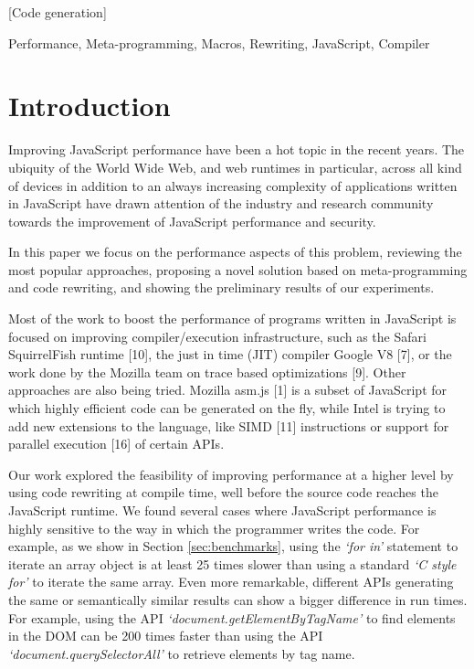 \documentclass[preprint,10pt]{sigplanconf}
\begin{document}
[Code generation]


\keywords
Performance, Meta-programming, Macros, Rewriting, JavaScript, Compiler

\section{Introduction}
Improving JavaScript performance have been a hot topic in the recent years. The ubiquity of the World Wide Web, and web runtimes in particular, across all kind of devices in addition to an always increasing complexity of applications written in JavaScript have drawn attention of the industry and research community towards the improvement of JavaScript performance and security.

In this paper we focus on the performance aspects of this problem, reviewing the most popular approaches, proposing a novel solution based on meta-programming and code rewriting, and showing the preliminary results of our experiments.

Most of the work to boost the performance of programs written in JavaScript is focused on improving compiler/execution infrastructure, such as the Safari SquirrelFish runtime [10], the just in time (JIT) compiler Google V8 [7], or the work done by the Mozilla team on trace based optimizations [9]. Other approaches are also being tried. Mozilla asm.js [1] is a subset of JavaScript for which highly efficient code can be generated on the fly, while Intel is trying to add new extensions to the language, like SIMD [11] instructions or support for parallel execution [16] of certain APIs.

Our work explored the feasibility of improving performance at a higher level by using code rewriting at compile time, well before the source code reaches the JavaScript runtime. We found several cases where JavaScript performance is highly sensitive to the way in which the programmer writes the code. For example, as we show in Section \ref{sec:benchmarks}, using the \emph{`for in'} statement to iterate an array object is at least 25 times slower than using a standard \emph{`C style for'} to iterate the same array. Even more remarkable, different APIs generating the same or semantically similar results can show a bigger difference in run times. For example, using the API \emph{`document.getElementByTagName'} to find elements in the DOM can be 200 times faster than using the API \emph{`document.querySelectorAll'}  to retrieve elements by tag name.
\end{document}
